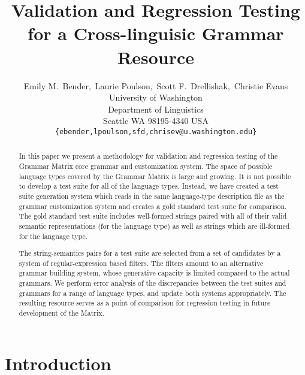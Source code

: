 \documentclass[11pt]{article}
\title{Validation and Regression Testing for a Cross-linguisic Grammar Resource}
\author{Emily M.~Bender,\  Laurie Poulson,\  Scott F.~Drellishak,\ Christie Evans\\
  University of Washington\\
  Department of Linguistics\\
  Seattle WA 98195-4340 USA\\
  {\tt \{ebender,lpoulson,sfd,chrisev@u.washington.edu\}}}
\date{}
\begin{document}
\maketitle
\begin{abstract}
  In this paper we present a methodology for validation and regression
  testing of the Grammar Matrix core grammar and customization system.
  The space of possible language types covered by the Grammar Matrix
  is large and growing. It is not possible to develop a test suite for
  all of the language types.  Instead, we have created a test suite
  generation system which reads in the same language-type description
  file as the grammar customization system and creates a gold standard
  test suite for comparison.  The gold standard test suite includes
  well-formed strings paired with all of their valid semantic
  representations (for the language type) as well as strings which are
  ill-formed for the language type.

  The string-semantics pairs for a test suite are selected from a set
  of candidates by a system of regular-expression based filters.  The
  filters amount to an alternative grammar building system, whose
  generative capacity is limited compared to the actual grammars.  We
  perform error analysis of the discrepancies between the test suites
  and grammars for a range of language types, and update both systems
  appropriately.  The resulting resource serves as a point of
  comparison for regression testing in future development of the
  Matrix.
\end{abstract}


\section{Introduction}
\end{document}
